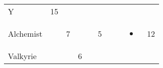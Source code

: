 \documentclass[12pt]{article}
\begin{document}
\begin{longtable}[]{@{}llllllllll@{}}
\begin{minipage}[t]{0.07\columnwidth}
Y
\strut\end{minipage} &
\begin{minipage}[t]{0.08\columnwidth}\raggedright\strut
15
\strut\end{minipage}\tabularnewline
\begin{minipage}[t]{0.13\columnwidth}\raggedright\strut
Alchemist
\strut\end{minipage} &
\begin{minipage}[t]{0.06\columnwidth}\raggedright\strut
\strut\end{minipage} &
\begin{minipage}[t]{0.06\columnwidth}\raggedright\strut
7
\strut\end{minipage} &
\begin{minipage}[t]{0.06\columnwidth}\raggedright\strut
\strut\end{minipage} &
\begin{minipage}[t]{0.06\columnwidth}\raggedright\strut
\strut\end{minipage} &
\begin{minipage}[t]{0.06\columnwidth}\raggedright\strut
5
\strut\end{minipage} &
\begin{minipage}[t]{0.06\columnwidth}\raggedright\strut
\strut\end{minipage} &
\begin{minipage}[t]{0.06\columnwidth}\raggedright\strut
\strut\end{minipage} &
\begin{minipage}[t]{0.07\columnwidth}\raggedright\strut
\begin{itemize}
\item
\end{itemize}
\strut\end{minipage} &
\begin{minipage}[t]{0.08\columnwidth}\raggedright\strut
12
\strut\end{minipage}\tabularnewline
\begin{minipage}[t]{0.13\columnwidth}\raggedright\strut
Valkyrie
\strut\end{minipage} &
\begin{minipage}[t]{0.06\columnwidth}\raggedright\strut
\strut\end{minipage} &
\begin{minipage}[t]{0.06\columnwidth}\raggedright\strut
\strut\end{minipage} &
\begin{minipage}[t]{0.06\columnwidth}\raggedright\strut
6

\end{minipage}
\end{longtable}
\end{document}
